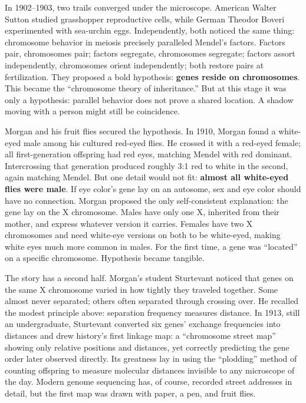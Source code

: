 \begin{zhengju}
In 1902--1903, two trails converged under the microscope. American Walter Sutton studied grasshopper reproductive cells, while German Theodor Boveri experimented with sea-urchin eggs. Independently, both noticed the same thing: chromosome behavior in meiosis precisely paralleled Mendel's factors. Factors pair, chromosomes pair; factors segregate, chromosomes segregate; factors assort independently, chromosomes orient independently; both restore pairs at fertilization. They proposed a bold hypothesis: \textbf{genes reside on chromosomes}. This became the ``chromosome theory of inheritance.'' But at this stage it was only a hypothesis: parallel behavior does not prove a shared location. A shadow moving with a person might still be coincidence.

Morgan and his fruit flies secured the hypothesis. In 1910, Morgan found a white-eyed male among his cultured red-eyed flies. He crossed it with a red-eyed female; all first-generation offspring had red eyes, matching Mendel with red dominant. Intercrossing that generation produced roughly 3:1 red to white in the second, again matching Mendel. But one detail would not fit: \textbf{almost all white-eyed flies were male}. If eye color's gene lay on an autosome, sex and eye color should have no connection. Morgan proposed the only self-consistent explanation: the gene lay on the X chromosome. Males have only one X, inherited from their mother, and express whatever version it carries. Females have two X chromosomes and need white-eye versions on both to be white-eyed, making white eyes much more common in males. For the first time, a gene was ``located'' on a specific chromosome. Hypothesis became tangible.

The story has a second half. Morgan's student Sturtevant noticed that genes on the same X chromosome varied in how tightly they traveled together. Some almost never separated; others often separated through crossing over. He recalled the modest principle above: separation frequency measures distance. In 1913, still an undergraduate, Sturtevant converted six genes' exchange frequencies into distances and drew history's first linkage map: a ``chromosome street map'' showing only relative positions and distances, yet correctly predicting the gene order later observed directly. Its greatness lay in using the ``plodding'' method of counting offspring to measure molecular distances invisible to any microscope of the day. Modern genome sequencing has, of course, recorded street addresses in detail, but the first map was drawn with paper, a pen, and fruit flies.
\end{zhengju}

